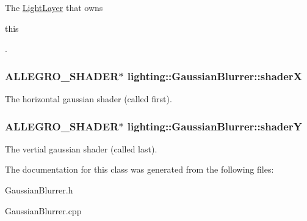 The \hyperlink{classlighting_1_1LightLayer}{Light\+Layer} that owns 
\begin{DoxyCode}
\textcolor{keyword}{this}
\end{DoxyCode}
. 

\subsubsection[{\texorpdfstring{shaderX}{shaderX}}]{\setlength{\rightskip}{0pt plus 5cm}A\+L\+L\+E\+G\+R\+O\+\_\+\+S\+H\+A\+D\+ER$\ast$ lighting\+::\+Gaussian\+Blurrer\+::shaderX\hspace{0.3cm}{\ttfamily [protected]}}\hypertarget{classlighting_1_1GaussianBlurrer_a36d10a62e2fd99e1182c596425fbacfa}{}\label{classlighting_1_1GaussianBlurrer_a36d10a62e2fd99e1182c596425fbacfa}


The horizontal gaussian shader (called first). 

\subsubsection[{\texorpdfstring{shaderY}{shaderY}}]{\setlength{\rightskip}{0pt plus 5cm}A\+L\+L\+E\+G\+R\+O\+\_\+\+S\+H\+A\+D\+ER$\ast$ lighting\+::\+Gaussian\+Blurrer\+::shaderY\hspace{0.3cm}{\ttfamily [protected]}}\hypertarget{classlighting_1_1GaussianBlurrer_a57c41b5a1dd0712e98d085a8a90172d4}{}\label{classlighting_1_1GaussianBlurrer_a57c41b5a1dd0712e98d085a8a90172d4}


The vertial gaussian shader (called last). 



The documentation for this class was generated from the following files\+:\begin{DoxyCompactItemize}
\item 
Gaussian\+Blurrer.\+h\item 
Gaussian\+Blurrer.\+cpp\end{DoxyCompactItemize}
